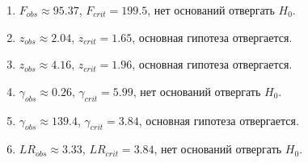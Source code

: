 \documentclass[12pt]{article}
\begin{document}
\begin{enumerate}
\item $F_{obs} \approx 95.37$, $F_{crit} = 199.5$, нет оснований отвергать $H_0$.
\item $z_{obs} \approx 2.04$, $z_{crit} = 1.65$, основная гипотеза отвергается.
\item $z_{obs} \approx 4.16$, $z_{crit} = 1.96$, основная гипотеза отвергается.
\item $\gamma_{obs} \approx 0.26$, $\gamma_{crit} = 5.99$, нет оснований отвергать $H_0$.
\item $\gamma_{obs} \approx 139.4$, $\gamma_{crit} = 3.84$, основная гипотеза отвергается.
\item $LR_{obs} \approx 3.33$, $LR_{crit} = 3.84$, нет оснований отвергать $H_0$.
\end{enumerate}
\end{document}
